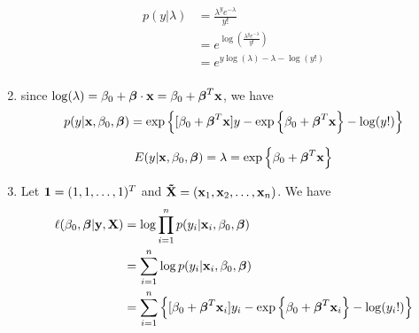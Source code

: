 \documentclass{article}
\newcommand{\vect}[1]{\boldsymbol{#1}}
\newcommand{\vectrm}[1]{\boldsymbol{\rm #1}}
\begin{document}
\begin{enumerate}[label=(\alph*)]
    \begin{align*}
      p(y | \lambda) &= \frac{\lambda^y e^{-\lambda}}{y!} \\
      &= e^{\log(\frac{\lambda^y e^{-\lambda}}{y!})} \\
      &= e^{y \log(\lambda) - \lambda - \log(y!)} \\
    \end{align*}

  \item
    since \(\log(\lambda) = \beta_0 + \vect{\beta}\cdot \vect{\rm x} = \beta_0 + \vect \beta^T \vectrm{x}\), we have
    \[
      p(y| \vectrm{x}, \beta_0, \vect{\beta}) = \exp\left\{ [\beta_0 + \vect{\beta}^T \vectrm{x}]y -
        \exp\left\{
          \beta_0 + \vect{\beta}^T \vectrm{x}
        \right\}
      - \log(y!)\right\}
    \]

    \[E(y| \vectrm{x}, \beta_0, \vect{\beta}) = \lambda =
      \exp\left\{
        \beta_0 + \vect{\beta}^T \vectrm{x}
      \right\}
    \]
  \item
  Let \(\vectrm{1} = (1, 1, \ldots, 1)^T\) and \(\vectrm{\tilde X} = (\vectrm{x}_1, \vectrm{x}_2, \ldots, \vectrm{x}_n)\). We have
    \begin{align*}
      \ell(\beta_0, \vect{\beta}| \vectrm{y}, \vectrm{X}) &= \log \prod_{i=1}^{n} p(y_i| \vectrm{x}_i, \beta_0, \vect{\beta}) \\
      &= \sum_{i=1}^{n} \log p(y_i| \vectrm{x}_i, \beta_0, \vect{\beta}) \\
        &= \sum_{i=1}^{n} \left\{ [\beta_0 + \vect{\beta}^T \vectrm{x}_i]y_i -
            \exp\left\{
            \beta_0 + \vect{\beta}^T \vectrm{x}_i
            \right\}
            - \log(y_i!)\right\} \\
    \end{align*}
\end{enumerate}
\end{document}
